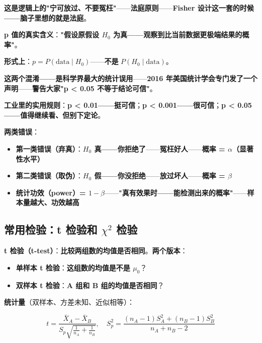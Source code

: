 \textbf{这是逻辑上的"宁可放过、不要冤枉"}——\textbf{法庭原则}——\textbf{Fisher 设计这一套的时候——脑子里想的就是法庭}。

\begin{tcolorbox}[colback=red!5, colframe=red!70!black, title={\textbf{p 值不是"原假设为真的概率"}}]
\textbf{p 值的真实含义}：\textbf{"假设原假设 $H_0$ 为真——观察到比当前数据更极端结果的概率"}。

\textbf{形式上}：\textbf{$p = P(\text{data} \mid H_0)$}——\textbf{不是} $P(H_0 \mid \text{data})$。

\textbf{这两个混淆——是科学界最大的统计误用}——\textbf{2016 年美国统计学会专门发了一个声明}——\textbf{警告大家"p < 0.05 不等于结论可信"}。

\textbf{工业里的实用规则}：\textbf{p < 0.01——挺可信}；\textbf{p < 0.001——很可信}；\textbf{p < 0.05——值得继续看、但别下定论}。
\end{tcolorbox}

\textbf{两类错误}：

\begin{itemize}
\item \textbf{第一类错误（弃真）}：\textbf{$H_0$ 真——你拒绝了}——\textbf{冤枉好人}——\textbf{概率 = $\alpha$（显著性水平）}
\item \textbf{第二类错误（取伪）}：\textbf{$H_0$ 假——你没拒绝}——\textbf{放过坏人}——\textbf{概率 = $\beta$}
\item \textbf{统计功效（power）= $1 - \beta$}——\textbf{"真有效果时——能检测出来的概率"}——\textbf{样本量越大、功效越高}
\end{itemize}

\subsection{常用检验：t 检验和 $\chi^2$ 检验}

\textbf{t 检验（t-test）}：\textbf{比较两组数的均值是否相同}。\textbf{两个版本}：

\begin{itemize}
\item \textbf{单样本 t 检验}：\textbf{这组数的均值是不是 $\mu_0$}？
\item \textbf{双样本 t 检验}：\textbf{A 组和 B 组的均值是否相同}？
\end{itemize}

\textbf{统计量}（双样本、方差未知、近似相等）：

\begin{equation}
t = \frac{\bar{X}_A - \bar{X}_B}{S_p \sqrt{\frac{1}{n_A} + \frac{1}{n_B}}}, \quad S_p^2 = \frac{(n_A-1)S_A^2 + (n_B-1)S_B^2}{n_A + n_B - 2}
\end{equation}

